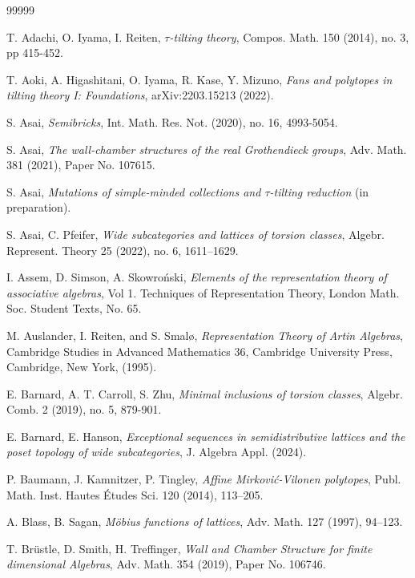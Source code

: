 \documentclass{amsart}
\theoremstyle{thmstyle}
\theoremstyle{exstyle}
\theoremstyle{defstyle}
\theoremstyle{remstyle}
\theoremstyle{remstyle}
\begin{document}
\begin{thebibliography}{99999}
    
     T. Adachi, O. Iyama, I. Reiten, 
\emph{$\tau$-tilting theory}, Compos. Math. 150 (2014), no. 3, pp 415-452.

     T. Aoki, A. Higashitani, O. Iyama, R. Kase, Y. Mizuno, 
\emph{Fans and polytopes in tilting theory I: Foundations}, arXiv:2203.15213 (2022).

     S. Asai, \emph{Semibricks}, Int. Math. Res. Not. (2020), no. 16, 4993-5054.

     S. Asai, \emph{The wall-chamber structures of the real Grothendieck groups}, Adv. Math. 381 (2021), Paper No. 107615.

     S. Asai, \emph{Mutations of simple-minded collections and $\tau$-tilting reduction} (in preparation).

     S. Asai, C. Pfeifer,
 \emph{Wide subcategories and lattices of torsion classes}, Algebr. Represent. Theory 25 (2022), no. 6, 1611–1629.

     I. Assem, D. Simson, A. Skowro\'nski, 
 \emph{Elements of the representation theory of associative algebras}, Vol 1. Techniques of Representation Theory, London Math. Soc. Student Texts, No. 65.

     M. Auslander, I. Reiten, and S. Smalø, 
\emph{Representation Theory of
Artin Algebras}, Cambridge Studies in Advanced Mathematics 36, Cambridge University Press, Cambridge, New York, (1995).
 
     E. Barnard, A. T. Carroll, S. Zhu, 
\emph{Minimal inclusions of torsion classes}, Algebr. Comb.
2 (2019), no. 5, 879-901.

     E. Barnard, E. Hanson, \emph{Exceptional sequences in semidistributive lattices and the poset topology of wide subcategories}, J. Algebra Appl. (2024).

     P. Baumann, J. Kamnitzer, P. Tingley, \emph{Affine Mirkovi\'{c}-Vilonen polytopes}, Publ. Math. Inst. Hautes \'{E}tudes Sci. 120 (2014), 113--205.

     A. Blass, B. Sagan,
\emph{Möbius functions of lattices}, Adv. Math. 127 (1997), 94–123.

     T. Br\"{u}stle, D. Smith, H. Treffinger, 
\emph{Wall and Chamber Structure for finite dimensional Algebras}, Adv. Math. 354 (2019), Paper No. 106746.


\end{thebibliography}
\end{document}
